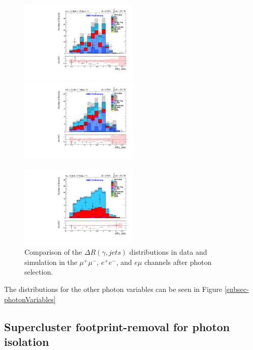 \begin{figure}
\includegraphics[width=0.5\textwidth]{Plots/ControlPlots/TTbarPhotonAnalysis/MuMu/Photons/SignalPhotons/Photon_deltaR_jets_splitTTbar_ratio.pdf}
\includegraphics[width=0.5\textwidth]{Plots/ControlPlots/TTbarPhotonAnalysis/EE/Photons/SignalPhotons/Photon_deltaR_jets_splitTTbar_ratio.pdf}\\
\begin{center}
\includegraphics[width=0.5\textwidth]{Plots/ControlPlots/TTbarPhotonAnalysis/EMu/Photons/SignalPhotons/Photon_deltaR_jets_splitTTbar_ratio.pdf}
\end{center}
\caption{Comparison of the $\Delta R(\gamma, jets)$ distributions in data and simulation in the $\mu^{+}\mu^{-}$, $e^{+}e^{-}$, and $e\mu$ channels after photon selection.}
\label{fig-photonDRjets}
\end{figure}

The distributions for the other photon variables can be seen in Figure \ref{subsec-photonVariables}


\subsection{Supercluster footprint-removal for photon isolation} \label{subsec-SCFR}

